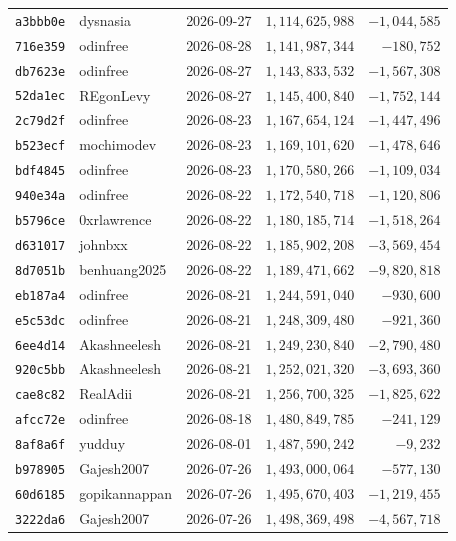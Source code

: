 {\begin{longtable}{@{}lllrr@{}}
\texttt{a3bbb0e} & dysnasia & 2026-09-27 & $1{,}114{,}625{,}988$ & $-1{,}044{,}585$\\
\texttt{716e359} & odinfree & 2026-08-28 & $1{,}141{,}987{,}344$ & $-180{,}752$\\
\texttt{db7623e} & odinfree & 2026-08-27 & $1{,}143{,}833{,}532$ & $-1{,}567{,}308$\\
\texttt{52da1ec} & REgonLevy & 2026-08-27 & $1{,}145{,}400{,}840$ & $-1{,}752{,}144$\\
\texttt{2c79d2f} & odinfree & 2026-08-23 & $1{,}167{,}654{,}124$ & $-1{,}447{,}496$\\
\texttt{b523ecf} & mochimodev & 2026-08-23 & $1{,}169{,}101{,}620$ & $-1{,}478{,}646$\\
\texttt{bdf4845} & odinfree & 2026-08-23 & $1{,}170{,}580{,}266$ & $-1{,}109{,}034$\\
\texttt{940e34a} & odinfree & 2026-08-22 & $1{,}172{,}540{,}718$ & $-1{,}120{,}806$\\
\texttt{b5796ce} & 0xrlawrence & 2026-08-22 & $1{,}180{,}185{,}714$ & $-1{,}518{,}264$\\
\texttt{d631017} & johnbxx & 2026-08-22 & $1{,}185{,}902{,}208$ & $-3{,}569{,}454$\\
\texttt{8d7051b} & benhuang2025 & 2026-08-22 & $1{,}189{,}471{,}662$ & $-9{,}820{,}818$\\
\texttt{eb187a4} & odinfree & 2026-08-21 & $1{,}244{,}591{,}040$ & $-930{,}600$\\
\texttt{e5c53dc} & odinfree & 2026-08-21 & $1{,}248{,}309{,}480$ & $-921{,}360$\\
\texttt{6ee4d14} & Akashneelesh & 2026-08-21 & $1{,}249{,}230{,}840$ & $-2{,}790{,}480$\\
\texttt{920c5bb} & Akashneelesh & 2026-08-21 & $1{,}252{,}021{,}320$ & $-3{,}693{,}360$\\
\texttt{cae8c82} & RealAdii & 2026-08-21 & $1{,}256{,}700{,}325$ & $-1{,}825{,}622$\\
\texttt{afcc72e} & odinfree & 2026-08-18 & $1{,}480{,}849{,}785$ & $-241{,}129$\\
\texttt{8af8a6f} & yudduy & 2026-08-01 & $1{,}487{,}590{,}242$ & $-9{,}232$\\
\texttt{b978905} & Gajesh2007 & 2026-07-26 & $1{,}493{,}000{,}064$ & $-577{,}130$\\
\texttt{60d6185} & gopikannappan & 2026-07-26 & $1{,}495{,}670{,}403$ & $-1{,}219{,}455$\\
\texttt{3222da6} & Gajesh2007 & 2026-07-26 & $1{,}498{,}369{,}498$ & $-4{,}567{,}718$\\

\end{longtable}}

